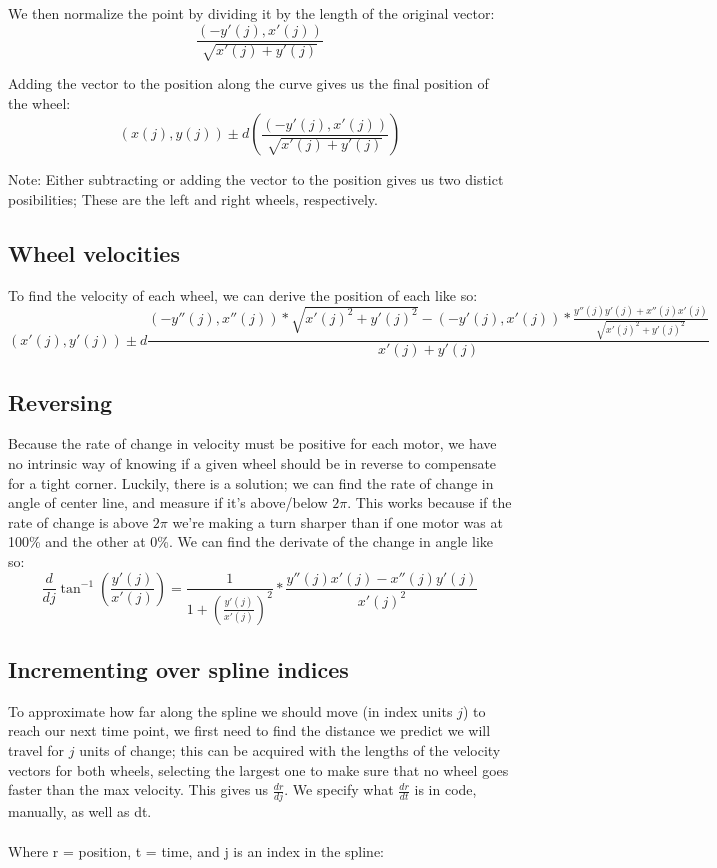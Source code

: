 \documentclass[12pt, english]{article}
\begin{document}
\noindent
We then normalize the point by dividing it by the length of the original vector: \\
\begin{equation}
	\label{deriv_speed_vec}
	\frac{(-y'(j), x'(j))}{\sqrt{x'(j)+y'(j)}}
\end{equation}

\noindent
Adding the vector to the position along the curve gives us the final position of the wheel:
\begin{equation}
	(x(j), y(j)) \pm d \left(\frac{(-y'(j), x'(j))}{\sqrt{x'(j)+y'(j)}}\right)
\end{equation}

\noindent
Note: Either subtracting or adding the vector to the position gives us two distict posibilities; These are the left and right wheels, respectively.

\subsection{Wheel velocities}
To find the velocity of each wheel, we can derive the position of each like so:
\begin{equation}
	(x'(j), y'(j)) \pm d\frac{(-y''(j), x''(j))*\sqrt{x'(j)^2+y'(j)^2} - (-y'(j), x'(j)) * \frac{y''(j)y'(j) + x''(j)x'(j)}{\sqrt{x'(j)^2+y'(j)^2}}}{x'(j)+y'(j)}
\end{equation}

\subsection{Reversing}
Because the rate of change in velocity must be positive for each motor, we have no intrinsic way of knowing if a given wheel should be in reverse to compensate for a tight corner. Luckily, there is a solution; we can find the rate of change in angle of center line, and measure if it's above/below $2\pi$. This works because if the rate of change is above $2\pi$ we're making a turn sharper than if one motor was at 100\% and the other at 0\%. We can find the derivate of the change in angle like so:
\begin{equation}
	\label{change_in_angle}
	\frac{d}{dj} 
	\tan^{-1}{\left(\frac{y'(j)}{x'(j)}\right)} = 
	\frac{1}{1 + \left(\frac{y'(j)}{x'(j)}\right)^2} * \frac{y''(j)x'(j) - x''(j)y'(j)}{x'(j)^2}
\end{equation}


\subsection{Incrementing over spline indices}
To approximate how far along the spline we should move (in index units $j$) to reach our next time point, we first need to find the distance we predict we will travel for $j$ units of change; this can be acquired with the lengths of the velocity vectors for both wheels, selecting the largest one to make sure that no wheel goes faster than the max velocity. This gives us $\frac{dr}{dj}$. We specify what $\frac{dr}{dt}$ is in code, manually, as well as dt. \\
\\
\noindent
Where r = position, t = time, and j is an index in the spline:
\end{document}
